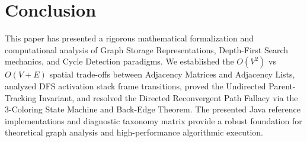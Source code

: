 \documentclass[10pt,journal,compsoc,onecolumn]{IEEEtran}
\begin{document}
\section{Conclusion}
\label{sec:conclusion}

This paper has presented a rigorous mathematical formalization and computational analysis of Graph Storage Representations, Depth-First Search mechanics, and Cycle Detection paradigms. We established the $O(V^2)$ vs $O(V+E)$ spatial trade-offs between Adjacency Matrices and Adjacency Lists, analyzed DFS activation stack frame transitions, proved the Undirected Parent-Tracking Invariant, and resolved the Directed Reconvergent Path Fallacy via the 3-Coloring State Machine and Back-Edge Theorem. The presented Java reference implementations and diagnostic taxonomy matrix provide a robust foundation for theoretical graph analysis and high-performance algorithmic execution.
\end{document}
